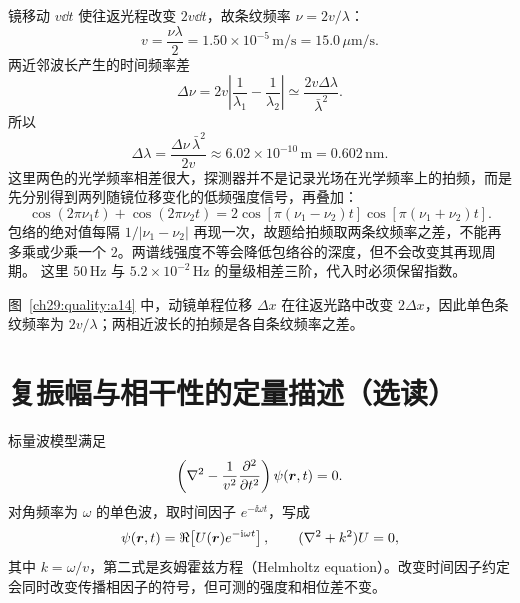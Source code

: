 \begin{xesolution}
\begin{center}\begin{minipage}{.96\linewidth}\centering
{}
\end{minipage}\end{center}

镜移动 $v\dd t$ 使往返光程改变 $2v\dd t$，故条纹频率 $\nu=2v/\lambda$：
\[
 \boxed{v=\frac{\nu\lambda}{2}=1.50\times10^{-5}\,\mathrm{m/s}=15.0\,\mu\mathrm{m/s}}.
\]
两近邻波长产生的时间频率差
\[
 \Delta\nu=2v\left|\frac1{\lambda_1}-\frac1{\lambda_2}\right|
 \simeq\frac{2v\Delta\lambda}{\bar\lambda^2}.
\]
所以
\[
 \boxed{\Delta\lambda=\frac{\Delta\nu\,\bar\lambda^2}{2v}
 \approx6.02\times10^{-10}\,\mathrm m=0.602\,\mathrm{nm}}.
\]
这里两色的光学频率相差很大，探测器并不是记录光场在光学频率上的拍频，而是先分别得到两列随镜位移变化的低频强度信号，再叠加：
\[
 \cos(2\pi\nu_1t)+\cos(2\pi\nu_2t)
 =2\cos[\pi(\nu_1-\nu_2)t]\cos[\pi(\nu_1+\nu_2)t].
\]
包络的绝对值每隔 $1/|\nu_1-\nu_2|$ 再现一次，故题给拍频取两条纹频率之差，不能再多乘或少乘一个 $2$。两谱线强度不等会降低包络谷的深度，但不会改变其再现周期。
这里 $50\,\mathrm{Hz}$ 与 $5.2\times10^{-2}\,\mathrm{Hz}$ 的量级相差三阶，代入时必须保留指数。

图~\ref{ch29:quality:a14} 中，动镜单程位移 $\Delta x$ 在往返光路中改变 $2\Delta x$，因此单色条纹频率为 $2v/\lambda$；两相近波长的拍频是各自条纹频率之差。
\end{xesolution}

\section{复振幅与相干性的定量描述（选读）}



标量波模型满足
\begin{equation}
 \left(\nabla^2-\frac1{v^2}\frac{\partial^2}{\partial t^2}\right)\psi(\bm{r},t)=0.
\end{equation}
对角频率为 $\omega$ 的单色波，取时间因子 $e^{-\ii\omega t}$，写成
\begin{equation}
 \psi(\bm{r},t)=\Re\!\left[U(\bm{r})e^{-\mathrm i\omega t}\right],
 \qquad (\nabla^2+k^2)U=0,
\end{equation}
其中 $k=\omega/v$，第二式是亥姆霍兹方程（Helmholtz equation）。改变时间因子约定会同时改变传播相因子的符号，但可测的强度和相位差不变。

